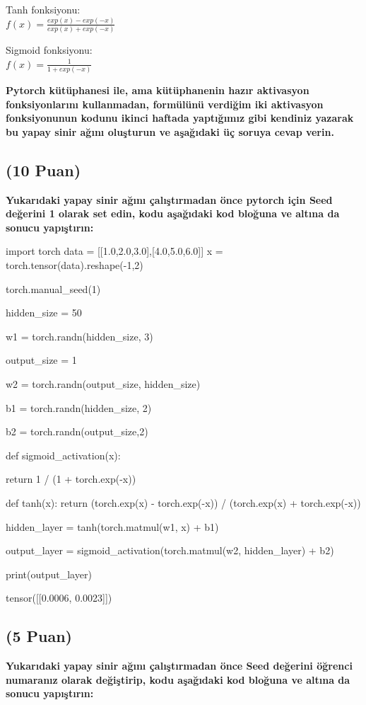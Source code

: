 \documentclass[11pt]{article}
\begin{document}
Tanh fonksiyonu:\\
$f(x) = \frac{exp(x) - exp(-x)}{exp(x) + exp(-x)}$
\vspace{.2in}

Sigmoid fonksiyonu:\\
$f(x) = \frac{1}{1 + exp(-x)}$

\vspace{.2in}
 \textbf{Pytorch kütüphanesi ile, ama kütüphanenin hazır aktivasyon fonksiyonlarını kullanmadan, formülünü verdiğim iki aktivasyon fonksiyonunun kodunu ikinci haftada yaptığımız gibi kendiniz yazarak bu yapay sinir ağını oluşturun ve aşağıdaki üç soruya cevap verin.}
 
\subsection{(10 Puan)} \textbf{Yukarıdaki yapay sinir ağını çalıştırmadan önce pytorch için Seed değerini 1 olarak set edin, kodu aşağıdaki kod bloğuna ve altına da sonucu yapıştırın:}

\begin{python}
import torch
data = [[1.0,2.0,3.0],[4.0,5.0,6.0]]
x = torch.tensor(data).reshape(-1,2)

torch.manual_seed(1)

hidden_size = 50

w1 = torch.randn(hidden_size, 3)

output_size = 1

w2 = torch.randn(output_size, hidden_size)

b1 = torch.randn(hidden_size, 2)

b2 = torch.randn(output_size,2)

def sigmoid_activation(x):

  return 1 / (1 + torch.exp(-x))

def tanh(x):
  return (torch.exp(x) - torch.exp(-x)) / (torch.exp(x) + torch.exp(-x))

hidden_layer = tanh(torch.matmul(w1, x) + b1)

output_layer = sigmoid_activation(torch.matmul(w2, hidden_layer) + b2)

print(output_layer)
\end{python}

tensor([[0.0006, 0.0023]])

\subsection{(5 Puan)} \textbf{Yukarıdaki yapay sinir ağını çalıştırmadan önce Seed değerini öğrenci numaranız olarak değiştirip, kodu aşağıdaki kod bloğuna ve altına da sonucu yapıştırın:}
\end{document}

